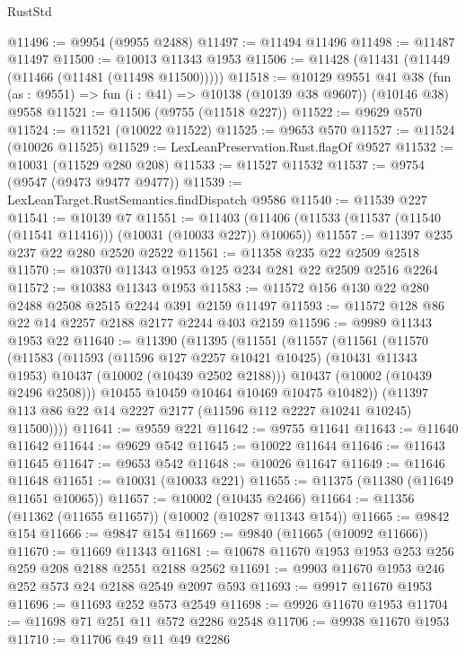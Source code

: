 \begin{lexlean}{RustStd}
\begin{coremodule}
@11496 := @9954 (@9955 @2488)
@11497 := @11494 @11496
@11498 := @11487 @11497
@11500 := @10013 @11343 @1953
@11506 := @11428 (@11431 (@11449 (@11466 (@11481 (@11498 @11500)))))
@11518 := @10129
    @9551
    @41
    @38
    (fun (as : @9551) => fun (i : @41) => @10138 (@10139 @38 @9607))
    (@10146 @38)
    @9558
@11521 := @11506 (@9755 (@11518 @227))
@11522 := @9629 @570
@11524 := @11521 (@10022 @11522)
@11525 := @9653 @570
@11527 := @11524 (@10026 @11525)
@11529 := LexLeanPreservation.Rust.flagOf @9527
@11532 := @10031 (@11529 @280 @208)
@11533 := @11527 @11532
@11537 := @9754 (@9547 (@9473 @9477 @9477))
@11539 := LexLeanTarget.RustSemantics.findDispatch @9586
@11540 := @11539 @227
@11541 := @10139 @7
@11551 := @11403 (@11406 (@11533 (@11537 (@11540 (@11541 @11416))) (@10031 (@10033 @227)) @10065))
@11557 := @11397 @235 @237 @22 @280 @2520 @2522
@11561 := @11358 @235 @22 @2509 @2518
@11570 := @10370 @11343 @1953 @125 @234 @281 @22 @2509 @2516 @2264
@11572 := @10383 @11343 @1953
@11583 := @11572 @156 @130 @22 @280 @2488 @2508 @2515 @2244 @391 @2159 @11497
@11593 := @11572 @128 @86 @22 @14 @2257 @2188 @2177 @2244 @403 @2159
@11596 := @9989 @11343 @1953 @22
@11640 := @11390
    (@11395
      (@11551
        (@11557
          (@11561
            (@11570
              (@11583
                (@11593
                  (@11596 @127 @2257 @10421 @10425)
                  (@10431 @11343 @1953)
                  @10437
                  (@10002 (@10439 @2502 @2188)))
                @10437
                (@10002 (@10439 @2496 @2508)))
              @10455
              @10459
              @10464
              @10469
              @10475
              @10482))
          (@11397 @113 @86 @22 @14 @2227 @2177 (@11596 @112 @2227 @10241 @10245) @11500))))
@11641 := @9559 @221
@11642 := @9755 @11641
@11643 := @11640 @11642
@11644 := @9629 @542
@11645 := @10022 @11644
@11646 := @11643 @11645
@11647 := @9653 @542
@11648 := @10026 @11647
@11649 := @11646 @11648
@11651 := @10031 (@10033 @221)
@11655 := @11375 (@11380 (@11649 @11651 @10065))
@11657 := @10002 (@10435 @2466)
@11664 := @11356 (@11362 (@11655 @11657)) (@10002 (@10287 @11343 @154))
@11665 := @9842 @154
@11666 := @9847 @154
@11669 := @9840 (@11665 (@10092 @11666))
@11670 := @11669 @11343
@11681 := @10678 @11670 @1953 @1953 @253 @256 @259 @208 @2188 @2551 @2188 @2562
@11691 := @9903 @11670 @1953 @246 @252 @573 @24 @2188 @2549 @2097 @593
@11693 := @9917 @11670 @1953
@11696 := @11693 @252 @573 @2549
@11698 := @9926 @11670 @1953
@11704 := @11698 @71 @251 @11 @572 @2286 @2548
@11706 := @9938 @11670 @1953
@11710 := @11706 @49 @11 @49 @2286

\end{coremodule}
\end{lexlean}
